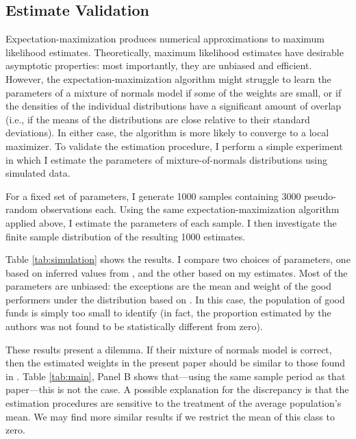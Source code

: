 	\subsection{Estimate Validation}
		Expectation-maximization produces numerical approximations to maximum likelihood estimates. Theoretically, maximum likelihood estimates have desirable asymptotic properties: most importantly, they are unbiased and efficient.  However, the expectation-maximization algorithm might struggle to learn the parameters of a mixture of normals model if some of the weights are small, or if the densities of the individual distributions have a significant amount of overlap (i.e., if the means of the distributions are close relative to their standard deviations). In either case, the algorithm is more likely to converge to a local maximizer. To validate the estimation procedure, I perform a simple experiment in which I estimate the parameters of mixture-of-normals distributions using simulated data.

		For a fixed set of parameters, I generate 1000 samples containing 3000 pseudo-random observations each. Using the same expectation-maximization algorithm applied above, I estimate the parameters of each sample. I then investigate the finite sample distribution of the resulting 1000 estimates.

		Table \ref{tab:simulation} shows the results. I compare two choices of parameters, one based on inferred values from \citet{Barras2010}, and the other based on my estimates. Most of the parameters are unbiased: the exceptions are the mean and weight of the good performers under the distribution based on \citet{Barras2010}.  In this case, the population of good funds is simply too small to identify (in fact, the proportion estimated by the authors was not found to be statistically different from zero).

		These results present a dilemma. If their mixture of normals model is correct, then the estimated weights in the present paper should be similar to those found in \citet{Barras2010}. Table \ref{tab:main}, Panel B shows that---using the same sample period as that paper---this is not the case.  A possible explanation for the discrepancy is that the estimation procedures are sensitive to the treatment of the average population's mean.  We may find more similar results if we restrict the mean of this class to zero.

